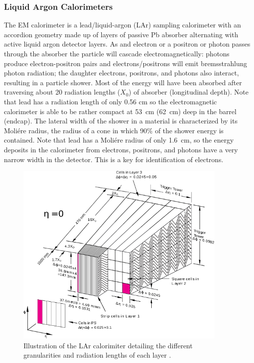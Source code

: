 \subsubsection{Liquid Argon Calorimeters} 
\label{sec:lar}
The EM calorimeter is a lead/liquid-argon (LAr) sampling calorimeter with an accordion geometry made up of layers of passive Pb absorber alternating with active liquid argon detector layers.
As and electron or a positron or photon passes through the absorber the particle will cascade electromagnetically: photons produce electron-positron pairs and electrons/positrons will emit bremsstrahlung photon radiation; the daughter electrons, positrons, and photons also interact, resulting in a particle shower.
Most of the energy will have been absorbed after traversing about 20 radiation lengths ($X_{0}$) of absorber (longitudinal depth).
Note that lead has a radiation length of only 0.56 cm so the electromagnetic calorimeter is able to be rather compact at 53~cm (62~cm) deep in the barrel (endcap).
The lateral width of the shower in a material is characterized by its Moli\'ere radius, the radius of a cone in which 90\% of the shower energy is contained.
Note that lead has a Moli\'ere radius of only 1.6~cm, so the energy deposits in the calorimeter from electrons, positrons, and photons have a very narrow width in the detector.
This is a key for identification of electrons.
\begin{figure}[h]
  \begin{center}
    \includegraphics[width=0.92\textwidth]{figs/detector/LAR.png}
  \end{center}
  \caption[Illustration of the LAr calorimiter detailing the different granularities and radiation lengths of each layer]
          {Illustration of the LAr calorimiter detailing the different granularities and radiation lengths of each layer \cite{PERF-2007-01}.}
          \label{fig:detector:LAr}
\end{figure}


